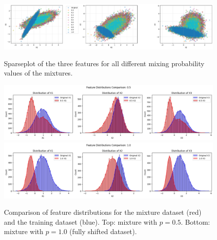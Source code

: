 \begin{figure}
    \centering
    \includegraphics[width=1.0\textwidth]{assets/sparse_mix_shift.png}
    \caption{Sparseplot of the three features for all different mixing probability values of the mixtures.}
    \label{fig:sparse_mix_shift}
    \vspace{1.5cm}
    \includegraphics[width=1.0\textwidth]{assets/dist_mix05.png}
    \includegraphics[width=1.0\textwidth]{assets/dist_fullshift.png}
    \caption{Comparison of feature distributions for the mixture dataset (red) and the training dataset (blue). Top: mixture with $p=0.5$. Bottom: mixture with $p=1.0$ (fully shifted dataset).}
    \label{fig:dist_mix05}
\end{figure}
